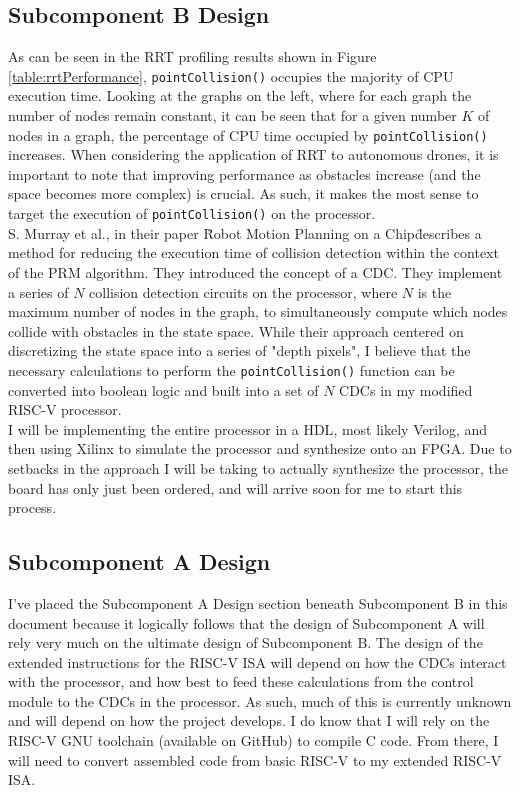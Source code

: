 \documentclass[11pt, oneside]{article}      %
\begin{document}
\subsection{Subcomponent B Design}
As can be seen in the \ac{RRT} profiling results shown in Figure \ref{table:rrtPerformance}, \texttt{pointCollision()} occupies the majority of CPU execution time. Looking at the graphs on the left, where for each graph the number of nodes remain constant, it can be seen that for a given number $K$ of nodes in a graph, the percentage of CPU time occupied by \texttt{pointCollision()} increases. When considering the application of RRT to autonomous drones, it is important to note that improving performance as obstacles increase (and the space becomes more complex) is crucial. As such, it makes the most sense to target the execution of \texttt{pointCollision()} on the processor. \\

S. Murray et al., in their paper \"Robot Motion Planning on a Chip\" describes a method for reducing the execution time of collision detection within the context of the \ac{PRM} algorithm.\cite{Murrayb} They introduced the concept of a \ac{CDC}. They implement a series of $N$ collision detection circuits on the processor, where $N$ is the maximum number of nodes in the graph, to simultaneously compute which nodes collide with obstacles in the state space. While their approach centered on discretizing the state space into a series of "depth pixels", I believe that the necessary calculations to perform the \texttt{pointCollision()} function can be converted into boolean logic and built into a set of $N$ \ac{CDC}s in my modified RISC-V processor. \\

I will be implementing the entire processor in a \ac{HDL}, most likely Verilog, and then using Xilinx to simulate the processor and synthesize onto an FPGA. Due to setbacks in the approach I will be taking to actually synthesize the processor, the board has only just been ordered, and will arrive soon for me to start this process.

\subsection{Subcomponent A Design}
I've placed the Subcomponent A Design section beneath Subcomponent B in this document because it logically follows that the design of Subcomponent A will rely very much on the ultimate design of Subcomponent B. The design of the extended instructions for the RISC-V ISA will depend on how the \ac{CDC}s interact with the processor, and how best to feed these calculations from the control module to the \ac{CDC}s in the processor. As such, much of this is currently unknown and will depend on how the project develops. I do know that I will rely on the RISC-V GNU toolchain (available on GitHub) to compile C code. From there, I will need to convert assembled code from basic RISC-V to my extended RISC-V ISA.
\end{document}
